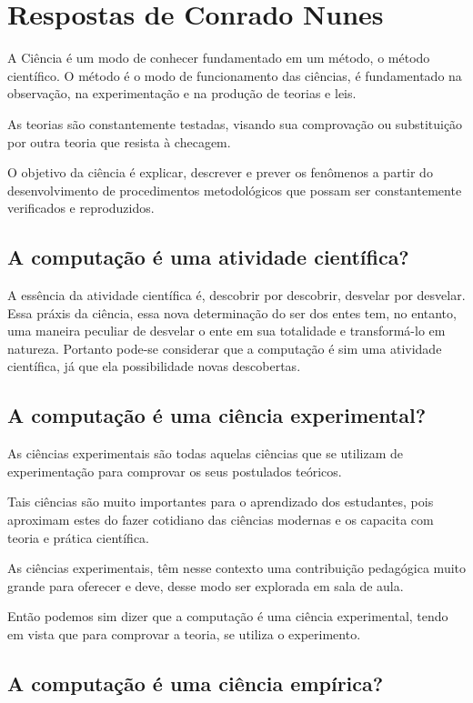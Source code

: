 \section{Respostas de Conrado Nunes}

A \gls{Ciência} é um modo de conhecer fundamentado em um método, o método científico. O método é o modo de funcionamento das ciências, é fundamentado na observação, na experimentação e na produção de teorias e leis.

As teorias são constantemente testadas, visando sua comprovação ou substituição por outra teoria que resista à checagem.

O objetivo da ciência é explicar, descrever e prever os fenômenos a partir do desenvolvimento de procedimentos metodológicos que possam ser constantemente verificados e reproduzidos.

\subsection{A computação é uma atividade científica?}
A essência da atividade científica é, descobrir por descobrir, desvelar por desvelar. Essa práxis da ciência, essa nova determinação do ser dos entes tem, no entanto, uma maneira peculiar de desvelar o ente em sua totalidade e transformá-lo em natureza.
Portanto pode-se considerar que a computação é sim uma atividade científica, já que ela possibilidade novas descobertas.

\subsection{A computação é uma ciência experimental?}
As \gls{ciências experimentais} são todas aquelas ciências que se utilizam de experimentação para comprovar os seus postulados teóricos.

Tais ciências são muito importantes para o aprendizado dos estudantes, pois aproximam estes do fazer cotidiano das ciências modernas e os capacita com teoria e prática científica.

As ciências experimentais, têm nesse contexto uma contribuição pedagógica muito grande para oferecer e deve, desse modo ser explorada em sala de aula.

Então podemos sim dizer que a computação é uma ciência experimental, tendo em vista que para comprovar a teoria, se utiliza o experimento.

\subsection{A computação é uma ciência empírica?}

